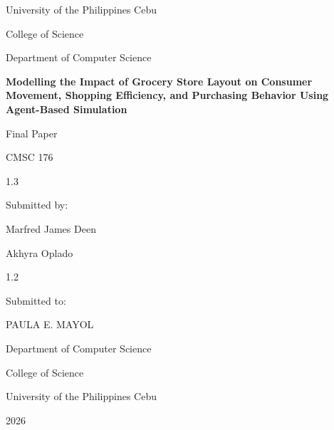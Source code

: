 \documentclass[12pt]{article}
\begin{document}
\begin{titlepage}
\centering

\vspace*{0.6in}

{\Large University of the Philippines Cebu\par}
\vspace{0.15in}
{\large College of Science\par}
{\large Department of Computer Science\par}

\vfill

{\bfseries\LARGE Modelling the Impact of Grocery Store Layout on Consumer Movement, Shopping Efficiency, and Purchasing Behavior Using Agent-Based Simulation\par}

\vfill

{\large Final Paper\par}
\vspace{0.2in}
{\large CMSC 176\par}

\vfill

\begin{spacing}{1.3}
{\large Submitted by:\par}
\vspace{0.15in}
{\Large Marfred James Deen\par}
{\Large Akhyra Oplado\par}
\end{spacing}

\vfill

\begin{spacing}{1.2}
{\large Submitted to:\par}
\vspace{0.15in}
{\Large PAULA E. MAYOL\par}
{\large Department of Computer Science\par}
{\large College of Science\par}
{\large University of the Philippines Cebu\par}
\end{spacing}

\vfill

{\large 2026\par}

\end{titlepage}
\end{document}
